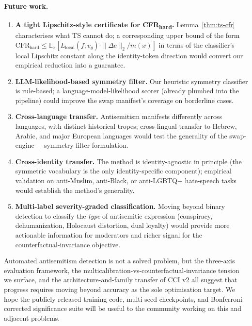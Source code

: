 \documentclass[10pt,a4paper]{article}
\begin{document}
\paragraph{Future work.}
\begin{enumerate}[leftmargin=*,itemsep=2pt]
    \item \textbf{A tight Lipschitz-style certificate for CFR\textsubscript{hard}.} Lemma~\ref{thm:ts-cfr} characterises what TS cannot do; a corresponding upper bound of the form
    $\mathrm{CFR}_{\text{hard}} \le \mathbb{E}_x[L_{\text{local}}(f; v_g) \cdot \|\Delta e\|_2 / m(x)]$
    in terms of the classifier's local Lipschitz constant along the identity-token direction would convert our empirical reduction into a guarantee.
    \item \textbf{LLM-likelihood-based symmetry filter.} Our heuristic symmetry classifier is rule-based; a language-model-likelihood scorer (already plumbed into the pipeline) could improve the swap manifest's coverage on borderline cases.
    \item \textbf{Cross-language transfer.} Antisemitism manifests differently across languages, with distinct historical tropes; cross-lingual transfer to Hebrew, Arabic, and major European languages would test the generality of the swap-engine + symmetry-filter formulation.
    \item \textbf{Cross-identity transfer.} The method is identity-agnostic in principle (the symmetric vocabulary is the only identity-specific component); empirical validation on anti-Muslim, anti-Black, or anti-LGBTQ+ hate-speech tasks would establish the method's generality.
    \item \textbf{Multi-label severity-graded classification.} Moving beyond binary detection to classify the \emph{type} of antisemitic expression (conspiracy, dehumanization, Holocaust distortion, dual loyalty) would provide more actionable information for moderators and richer signal for the counterfactual-invariance objective.
\end{enumerate}

Automated antisemitism detection is not a solved problem, but the three-axis evaluation framework, the multicalibration-vs-counterfactual-invariance tension we surface, and the architecture-and-family transfer of CCI v2 all suggest that progress requires moving beyond accuracy as the sole optimisation target. We hope the publicly released training code, multi-seed checkpoints, and Bonferroni-corrected significance suite will be useful to the community working on this and adjacent problems.



\end{document}
